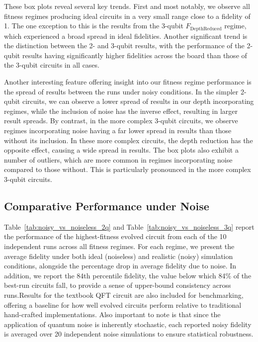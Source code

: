 \documentclass[11pt,a4paper]{article}
\begin{document}
These box plots reveal several key trends. First and most notably, we observe all fitness regimes producing ideal circuits in a very small range close to a fidelity of 1. The one exception to this is the results from the 3-qubit $F_{\mathrm{DepthReduced}}$ regime, which experienced a broad spread in ideal fidelities. Another significant trend is the distinction between the 2- and 3-qubit results, with the performance of the 2-qubit results having significantly higher fidelities across the board than those of the 3-qubit circuits in all cases.\newline

Another interesting feature offering insight into our fitness regime performance is the spread of results between the runs under noisy conditions. In the simpler 2-qubit circuits, we can observe a lower spread of results in our depth incorporating regimes, while the inclusion of noise has the inverse effect, resulting in larger result spreads. By contrast, in the more complex 3-qubit circuits, we observe regimes incorporating noise having a far lower spread in results than those without its inclusion. In these more complex circuits, the depth reduction has the opposite effect, causing a wide spread in results. The box plots also exhibit a number of outliers, which are more common in regimes incorporating noise compared to those without. This is particularly pronounced in the more complex 3-qubit circuits.

\subsection{Comparative Performance under Noise}\label{sec:performance_tables}
Table~\ref{tab:noisy_vs_noiseless_2q} and Table~\ref{tab:noisy_vs_noiseless_3q} report the performance of the highest-fitness evolved circuit from each of the 10 independent runs across all fitness regimes. For each regime, we present the average fidelity under both ideal (noiseless) and realistic (noisy) simulation conditions, alongside the percentage drop in average fidelity due to noise. In addition, we report the 84th percentile fidelity, the value below which 84\% of the best-run circuits fall, to provide a sense of upper-bound consistency across runs.Results for the textbook QFT circuit are also included for benchmarking, offering a baseline for how well evolved circuits perform relative to traditional hand-crafted implementations. Also important to note is that since the application of quantum noise is inherently stochastic, each reported noisy fidelity is averaged over 20 independent noise simulations to ensure statistical robustness.
\end{document}
